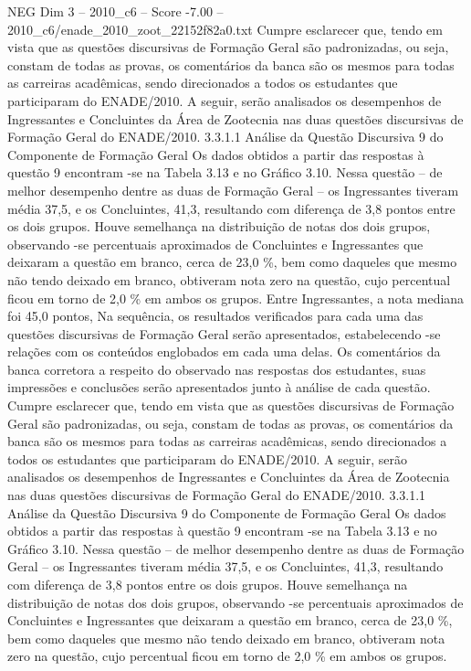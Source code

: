 \begin{textsample}{NEG Dim 3 – 2010\_c6 – Score -7.00 – 2010\_c6/enade\_2010\_zoot\_22152f82a0.txt}
Cumpre esclarecer que, tendo em vista que as questões discursivas de Formação Geral são padronizadas, ou seja, constam de todas as provas, os comentários da banca são os mesmos para todas as carreiras acadêmicas, sendo direcionados a todos os estudantes que participaram do ENADE/2010.
A seguir, serão analisados os desempenhos de Ingressantes e Concluintes da Área de Zootecnia nas duas questões discursivas de Formação Geral do ENADE/2010. 3.3.1.1 Análise da Questão Discursiva 9 do Componente de Formação Geral Os dados obtidos a partir das respostas à questão 9 encontram -se na Tabela 3.13 e no Gráfico 3.10.
Nessa questão – de melhor desempenho dentre as duas de Formação Geral – os Ingressantes tiveram média 37,5, e os Concluintes, 41,3, resultando com diferença de 3,8 pontos entre os dois grupos.
Houve semelhança na distribuição de notas dos dois grupos, observando -se percentuais aproximados de Concluintes e Ingressantes que deixaram a questão em branco, cerca de 23,0 \%, bem como daqueles que mesmo não tendo deixado em branco, obtiveram nota zero na questão, cujo percentual ficou em torno de 2,0 \% em ambos os grupos.
Entre Ingressantes, a nota mediana foi 45,0 pontos, Na sequência, os resultados verificados para cada uma das questões discursivas de Formação Geral serão apresentados, estabelecendo -se relações com os conteúdos englobados em cada uma delas.
Os comentários da banca corretora a respeito do observado nas respostas dos estudantes, suas impressões e conclusões serão apresentados junto à análise de cada questão.
Cumpre esclarecer que, tendo em vista que as questões discursivas de Formação Geral são padronizadas, ou seja, constam de todas as provas, os comentários da banca são os mesmos para todas as carreiras acadêmicas, sendo direcionados a todos os estudantes que participaram do ENADE/2010.
A seguir, serão analisados os desempenhos de Ingressantes e Concluintes da Área de Zootecnia nas duas questões discursivas de Formação Geral do ENADE/2010. 3.3.1.1 Análise da Questão Discursiva 9 do Componente de Formação Geral Os dados obtidos a partir das respostas à questão 9 encontram -se na Tabela 3.13 e no Gráfico 3.10.
Nessa questão – de melhor desempenho dentre as duas de Formação Geral – os Ingressantes tiveram média 37,5, e os Concluintes, 41,3, resultando com diferença de 3,8 pontos entre os dois grupos.
Houve semelhança na distribuição de notas dos dois grupos, observando -se percentuais aproximados de Concluintes e Ingressantes que deixaram a questão em branco, cerca de 23,0 \%, bem como daqueles que mesmo não tendo deixado em branco, obtiveram nota zero na questão, cujo percentual ficou em torno de 2,0 \% em ambos os grupos.

\end{textsample}
